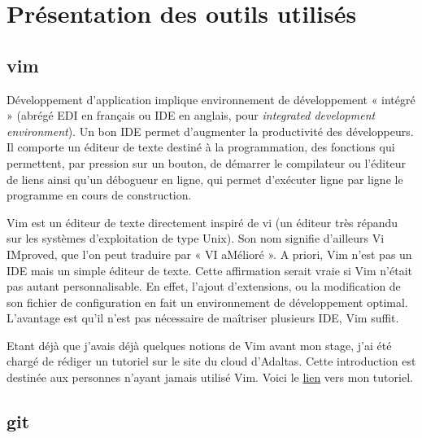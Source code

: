 \documentclass[12pt, french]{report}
\begin{document}
\section{Présentation des outils utilisés}

\subsection{vim}

Développement d'application implique environnement de développement « intégré » (abrégé EDI en français ou IDE en anglais, pour \textit{integrated development environment}). Un bon IDE permet d'augmenter la productivité des développeurs. Il comporte un éditeur de texte destiné à la programmation, des fonctions qui permettent, par pression sur un bouton, de démarrer le compilateur ou l'éditeur de liens ainsi qu'un débogueur en ligne, qui permet d'exécuter ligne par ligne le programme en cours de construction.

Vim est un éditeur de texte directement inspiré de vi (un éditeur très répandu sur les systèmes d’exploitation de type Unix). Son nom signifie d’ailleurs Vi IMproved, que l’on peut traduire par « VI aMélioré ». A priori, Vim n'est pas un IDE mais un simple éditeur de texte. Cette affirmation serait vraie si Vim n'était pas autant personnalisable. En effet, l'ajout  d'extensions, ou la modification de son fichier de configuration en fait un environnement de développement optimal. L'avantage est qu'il n'est pas nécessaire de maîtriser plusieurs IDE, Vim suffit.

Etant déjà que j'avais déjà quelques notions de Vim avant mon stage, j'ai été chargé de rédiger un tutoriel sur le site du cloud d'Adaltas. Cette introduction est destinée aux personnes n'ayant jamais utilisé Vim. Voici le \href{https://www.adaltas.cloud/en/docs/foundations/vim/}{lien} vers mon tutoriel.

\subsection{git}
\end{document}
